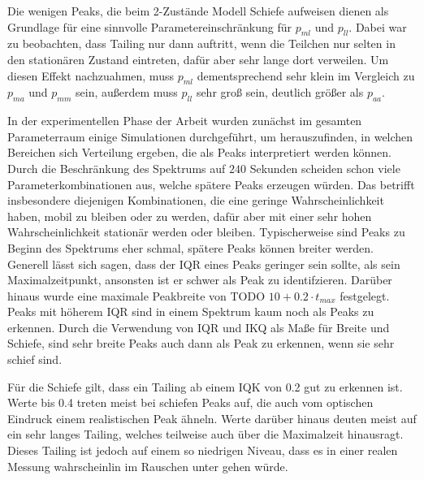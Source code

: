 Die wenigen Peaks, die beim 2-Zustände Modell Schiefe aufweisen dienen als Grundlage für eine sinnvolle Parametereinschränkung für $p_{ml}$ und $p_{ll}$. Dabei war zu beobachten, dass Tailing nur dann auftritt, wenn die Teilchen nur selten in den stationären Zustand eintreten, dafür aber sehr lange dort verweilen. Um diesen Effekt nachzuahmen, muss $p_{ml}$ dementsprechend sehr klein im Vergleich zu $p_{ma}$ und $p_{mm}$ sein, außerdem muss $p_{ll}$ sehr groß sein, deutlich größer als $p_{aa}$.

In der experimentellen Phase der Arbeit wurden zunächst im gesamten Parameterraum %
einige Simulationen durchgeführt, um herauszufinden, in welchen Bereichen sich Verteilung ergeben, die als Peaks interpretiert werden können. 
Durch die Beschränkung des Spektrums auf $240$ Sekunden scheiden schon viele Parameterkombinationen aus, welche spätere Peaks erzeugen würden. Das betrifft insbesondere diejenigen Kombinationen, die eine geringe Wahrscheinlichkeit haben, mobil zu bleiben oder zu werden, dafür aber mit einer sehr hohen Wahrscheinlichkeit stationär werden oder bleiben. 
Typischerweise sind Peaks zu Beginn des Spektrums eher schmal, spätere Peaks können breiter werden. 
Generell lässt sich sagen, dass der IQR eines Peaks geringer sein sollte, als sein Maximalzeitpunkt, ansonsten ist er schwer als Peak zu identifzieren. Darüber hinaus wurde eine maximale Peakbreite von TODO $10+0.2\cdot t_{max}$  festgelegt. Peaks mit höherem IQR sind in einem Spektrum kaum noch als Peaks zu erkennen.
Durch die Verwendung von IQR und IKQ als Maße für Breite und Schiefe, sind sehr breite Peaks auch dann als Peak zu erkennen, wenn sie sehr schief sind.

Für die Schiefe gilt, dass ein Tailing ab einem IQK von 0.2 gut zu erkennen ist. Werte bis 0.4 treten meist bei schiefen Peaks auf, die auch vom optischen Eindruck einem realistischen Peak ähneln. Werte darüber hinaus deuten meist auf ein sehr langes Tailing, welches teilweise auch über die Maximalzeit hinausragt. Dieses Tailing ist jedoch auf einem so niedrigen Niveau, dass es in einer realen Messung wahrscheinlin im Rauschen unter gehen würde.

